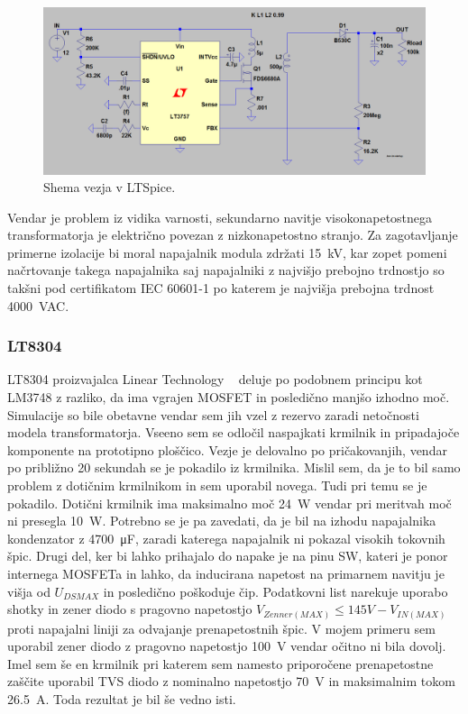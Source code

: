 \documentclass[a4paper,twoside,openright,12pt,slovene]{book}
\begin{document}
    \begin{figure}[H]
        \centering
        \includegraphics[width=1\columnwidth]{Slike/Simulacije/LM3757spice.png}
        \caption{\label{LM3757spice} Shema vezja v LTSpice.}
    \end{figure}
    
Vendar je problem iz vidika varnosti, sekundarno navitje visokonapetostnega transformatorja je električno povezan z nizkonapetostno stranjo. Za zagotavljanje primerne izolacije bi moral napajalnik modula zdržati \SI{15}{\kilo\volt}, kar zopet pomeni načrtovanje takega napajalnika saj napajalniki z najvišjo prebojno trdnostjo so takšni pod certifikatom IEC 60601-1 po katerem je najvišja prebojna trdnost \SI{4000}{\volt}AC.

	\subsubsection{LT8304} \label{LT8304}
LT8304 proizvajalca Linear Technology ~\cite{analog:LT8304} deluje po podobnem principu kot LM3748 z razliko, da ima vgrajen MOSFET in posledično manjšo izhodno moč. Simulacije so bile obetavne vendar sem jih vzel z rezervo zaradi netočnosti modela transformatorja. Vseeno sem se odločil naspajkati krmilnik in pripadajoče komponente na prototipno ploščico. Vezje je delovalno po pričakovanjih, vendar po približno 20 sekundah se je pokadilo iz krmilnika. Mislil sem, da je to bil samo problem z dotičnim krmilnikom in sem uporabil novega. Tudi pri temu se je pokadilo. Dotični krmilnik ima maksimalno moč \SI{24}{\watt} vendar pri meritvah moč ni presegla \SI{10}{\watt}. Potrebno se je pa zavedati, da je bil na izhodu napajalnika kondenzator z \SI{4700}{\micro\farad}, zaradi katerega napajalnik ni pokazal visokih tokovnih špic. Drugi del, ker bi lahko prihajalo do napake je na pinu SW, kateri je ponor internega MOSFETa in lahko, da inducirana napetost na primarnem navitju je višja od \(U_{DS MAX}\) in posledično poškoduje čip. Podatkovni list narekuje uporabo shotky in zener diodo s pragovno napetostjo \(V_{Zenner(MAX)} \leq 145V - V_{IN(MAX)}\) proti napajalni liniji za odvajanje prenapetostnih špic. V mojem primeru sem uporabil zener diodo z pragovno napetostjo \SI{100}{\volt} vendar očitno ni bila dovolj. Imel sem še en krmilnik pri katerem sem namesto priporočene prenapetostne zaščite uporabil TVS diodo z nominalno napetostjo \SI{70}{\volt} in maksimalnim tokom \SI{26.5}{\ampere}. Toda rezultat je bil še vedno isti.
\end{document}
